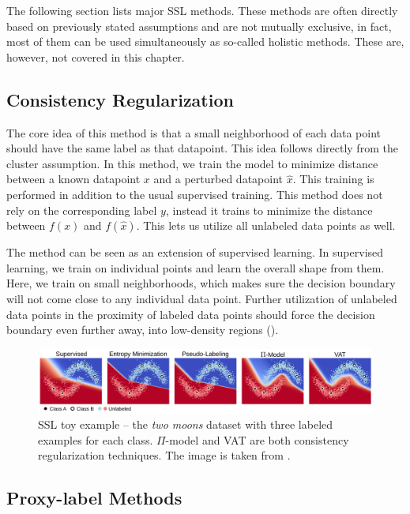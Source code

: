 The following section lists major SSL methods. These methods are often directly based on previously stated assumptions and are not mutually exclusive, in fact, most of them can be used simultaneously as so-called holistic methods. These are, however, not covered in this chapter.


\subsection{Consistency Regularization}

The core idea of this method is that a small neighborhood of each data point should have the same label as that datapoint. This idea follows directly from the cluster assumption. In this method, we train the model to minimize distance between a known datapoint $x$ and a perturbed datapoint $\hat{x}$. This training is performed in addition to the usual supervised training. This method does not rely on the corresponding label $y$, instead it trains to minimize the distance between $f(x)$ and $f(\hat{x})$. This lets us utilize all unlabeled data points as well.

The method can be seen as an extension of supervised learning. In supervised learning, we train on individual points and learn the overall shape from them. Here, we train on small neighborhoods, which makes sure the decision boundary will not come close to any individual data point. Further utilization of unlabeled data points in the proximity of labeled data points should force the decision boundary even further away, into low-density regions (\cite{SslTechnicalReport}).

\begin{figure}[ht]
    \centering
    \includegraphics[width=145mm]{../img/ssl-toy.png}
    \caption{SSL toy example -- the \emph{two moons} dataset with three labeled examples for each class. $\Pi$-model and VAT are both consistency regularization techniques. The image is taken from \cite{SemisupervisedOverview}.}
    \label{fig:SslToy}
\end{figure}


\subsection{Proxy-label Methods}

